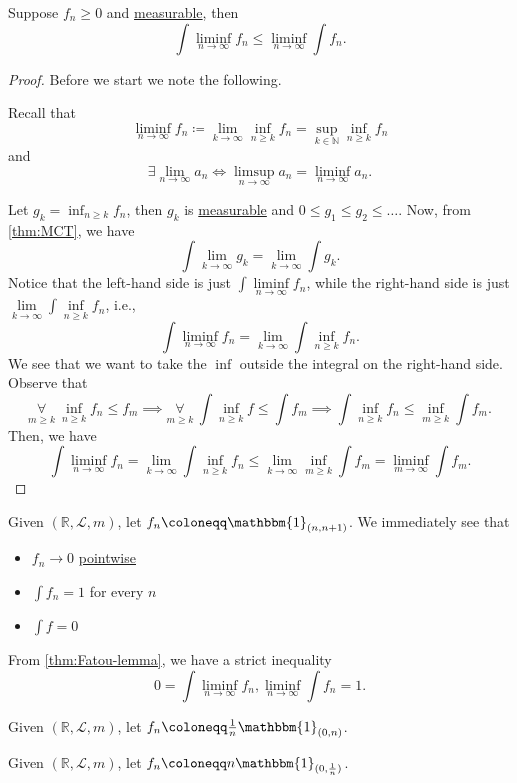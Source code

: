 \begin{theorem}\label{thm:Fatou-lemma}
	Suppose \(f_{n}\geq 0\) and \hyperref[def:measurable-function]{measurable}, then
	\[
		\int \liminf_{n \to \infty} f_{n}\leq \liminf_{n \to \infty} \int f_{n}.
	\]
\end{theorem}
\begin{proof}
	Before we start we note the following.
	\begin{remark}
		Recall that
		\[
			\liminf_{n \to \infty} f_{n} \coloneqq \lim\limits_{k \to \infty} \inf_{n\geq k}f_{n} = \sup _{k\in\mathbb{N} }\inf _{n\geq k}f_{n}
		\]
		and
		\[
			\exists\lim\limits_{n \to \infty} a_{n}\iff \limsup_{n \to \infty} a_{n} = \liminf_{n \to \infty} a_{n}.
		\]
	\end{remark}
	Let \(g_{k} = \inf _{n\geq k}f_{n}\), then \(g_{k}\) is \hyperref[def:measurable-function]{measurable} and \(0\leq g_1 \leq g_2 \leq \dots  \). Now, from \autoref{thm:MCT}, we have
	\[
		\int \lim\limits_{k \to \infty}  g_{k} = \lim\limits_{k \to \infty} \int g_{k}.
	\]
	Notice that the left-hand side is just \(\int \liminf\limits_{n \to \infty} f_{n}\), while the right-hand side is just \(\lim\limits_{k \to \infty} \int \inf\limits _{n\geq k}f_{n}\),
	i.e.,
	\[
		\int \liminf_{n \to \infty} f_{n} = \lim\limits_{k \to \infty} \int \inf _{n\geq k}f_{n}.
	\]
	We see that we want to take the \(\inf\) outside the integral on the right-hand side. Observe that
	\[
		\underset{m\geq k}{\forall }\ \inf _{n\geq k}f_{n}\leq f _{m} \implies \underset{m\geq k}{\forall }\ \int \inf _{n\geq k}f\leq \int f _{m}\implies \int \inf _{n\geq k}f_{n}\leq \inf_{m\geq k}\int f _{m}.
	\]
	Then, we have
	\[
		\int \liminf_{n \to \infty} f_{n} = \lim\limits_{k \to \infty} \int \inf _{n\geq k}f_{n}\leq \lim\limits_{k \to \infty} \inf _{m\geq k}\int f _{m} = \liminf_{m \to \infty} \int f _{m}.
	\]
\end{proof}
\begin{eg}
	Given \((\mathbb{R} , \mathcal{L} , m)\), let \(f_{n}\coloneqq \mathbbm{1}_{(n, n+1)} \). We immediately see that
	\begin{itemize}
		\item \(f_{n}\to 0\) \hyperref[def:pointwise-convergence]{pointwise}
		\item \(\int f_{n} = 1\) for every \(n\)
		\item \(\int f = 0\)
	\end{itemize}
	From \autoref{thm:Fatou-lemma}, we have a strict inequality
	\[
		0 = \int \liminf_{n \to \infty} f_{n} , \liminf_{n \to \infty} \int f_{n} = 1.
	\]
\end{eg}
\begin{eg}
	Given \((\mathbb{R} , \mathcal{L} , m)\), let \(f_{n}\coloneqq \frac{1}{n}\mathbbm{1}_{(0, n)} \).
\end{eg}
\begin{eg}
	Given \((\mathbb{R} , \mathcal{L} , m)\), let \(f_{n}\coloneqq n \mathbbm{1}_{(0, \frac{1}{n})} \).
\end{eg}

